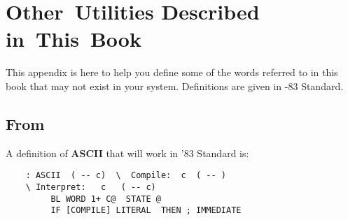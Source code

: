 \chapter{Other~Utilities
Described
in~This~Book}
This appendix is here to help you define some of the words referred to in 
this book that may not exist in your system.  Definitions are given in
\Forth{}-83 Standard.
\section{From }
A definition of {\bf ASCII} that will work in '83 Standard is:
\begin{verbatim}
    : ASCII  ( -- c)  \  Compile:  c  ( -- )
    \ Interpret:   c   ( -- c)
         BL WORD 1+ C@  STATE @
         IF [COMPILE] LITERAL  THEN ; IMMEDIATE
\end{verbatim}
